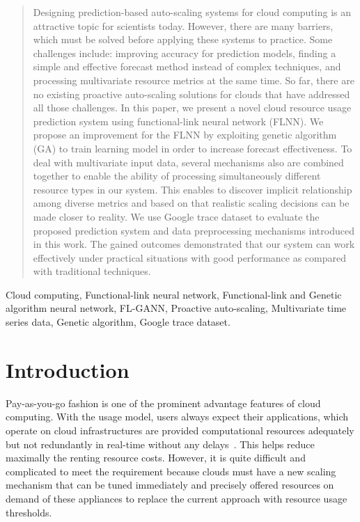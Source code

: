 \documentclass[conference]{IEEEtran}
\begin{document}
\begin{abstract}
Designing prediction-based auto-scaling systems for cloud computing is an attractive topic for scientists today. However, there are many barriers, which must be solved before applying these systems to practice. Some challenges include: improving accuracy for prediction models, finding a simple and effective forecast method instead of complex techniques, and processing multivariate resource metrics at the same time. So far, there are no existing proactive auto-scaling solutions for clouds that have addressed all those challenges. In this paper, we present a novel cloud resource usage prediction system using functional-link neural network (FLNN). We propose an improvement for the FLNN by exploiting genetic algorithm (GA) to train learning model in order to increase forecast effectiveness. To deal with multivariate input data, several mechanisms also are combined together to enable the ability of processing simultaneously different resource types in our system. This enables to discover implicit relationship among diverse metrics and based on that realistic scaling decisions can be made closer to reality. We use Google trace dataset to evaluate the proposed prediction system and data preprocessing mechanisms introduced in this work. The gained outcomes demonstrated that our system can work effectively under practical situations with good performance as compared with traditional techniques.
\end{abstract}

\begin{IEEEkeywords}
Cloud computing, Functional-link neural network, Functional-link and Genetic algorithm neural network, FL-GANN, Proactive auto-scaling, Multivariate time series data, Genetic algorithm, Google trace dataset.
\end{IEEEkeywords}

\section{Introduction}
\label{intro}
Pay-as-you-go fashion is one of the prominent advantage features of cloud computing. With the usage model, users always expect their applications, which operate on cloud infrastructures are provided computational resources adequately but not redundantly in real-time without any delays~\cite{ref_abstraction}. This helps reduce maximally the renting resource costs. However, it is quite difficult and complicated to meet the requirement because clouds must have a new scaling mechanism that can be tuned immediately and precisely offered resources on demand of these appliances to replace the current approach with resource usage thresholds. 
\end{document}

